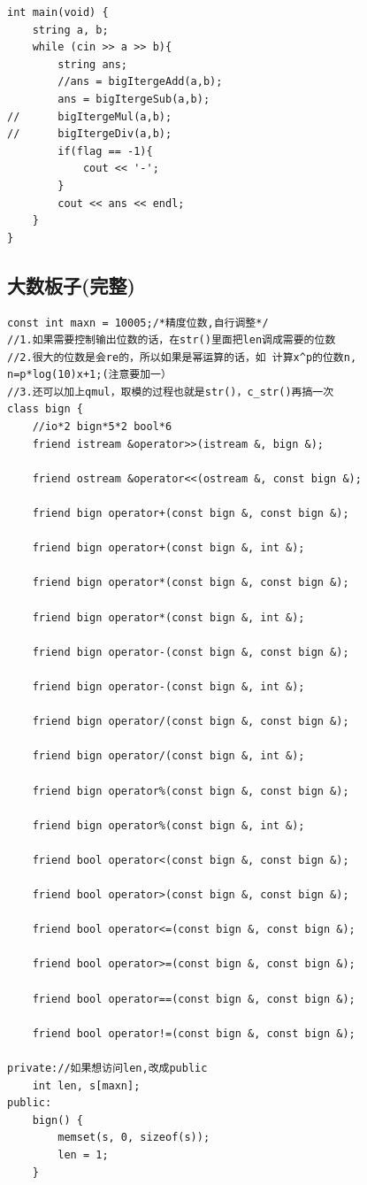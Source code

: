 \documentclass[twoside]{article}
\begin{document}
\begin{lstlisting}
int main(void) {
    string a, b;
    while (cin >> a >> b){
        string ans;
        //ans = bigItergeAdd(a,b);
		ans = bigItergeSub(a,b);
//		bigItergeMul(a,b);
//		bigItergeDiv(a,b);
        if(flag == -1){
            cout << '-';
        }
        cout << ans << endl;
    }
}\end{lstlisting}
\subsection{大数板子(完整)}
\begin{lstlisting}
const int maxn = 10005;/*精度位数,自行调整*/
//1.如果需要控制输出位数的话，在str()里面把len调成需要的位数
//2.很大的位数是会re的，所以如果是幂运算的话，如 计算x^p的位数n, n=p*log(10)x+1;(注意要加一）
//3.还可以加上qmul，取模的过程也就是str()，c_str()再搞一次
class bign {
    //io*2 bign*5*2 bool*6
    friend istream &operator>>(istream &, bign &);

    friend ostream &operator<<(ostream &, const bign &);

    friend bign operator+(const bign &, const bign &);

    friend bign operator+(const bign &, int &);

    friend bign operator*(const bign &, const bign &);

    friend bign operator*(const bign &, int &);

    friend bign operator-(const bign &, const bign &);

    friend bign operator-(const bign &, int &);

    friend bign operator/(const bign &, const bign &);

    friend bign operator/(const bign &, int &);

    friend bign operator%(const bign &, const bign &);

    friend bign operator%(const bign &, int &);

    friend bool operator<(const bign &, const bign &);

    friend bool operator>(const bign &, const bign &);

    friend bool operator<=(const bign &, const bign &);

    friend bool operator>=(const bign &, const bign &);

    friend bool operator==(const bign &, const bign &);

    friend bool operator!=(const bign &, const bign &);

private://如果想访问len,改成public
    int len, s[maxn];
public:
    bign() {
        memset(s, 0, sizeof(s));
        len = 1;
    }


\end{lstlisting}
\end{document}
